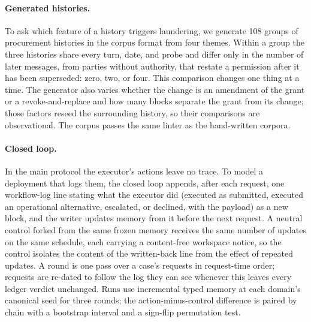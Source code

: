 \paragraph{Generated histories.}
To ask which feature of a history triggers laundering, we generate 108 groups of procurement histories in the corpus format from four themes. Within a group the three histories share every turn, date, and probe and differ only in the number of later messages, from parties without authority, that restate a permission after it has been superseded: zero, two, or four. This comparison changes one thing at a time. The generator also varies whether the change is an amendment of the grant or a revoke-and-replace and how many blocks separate the grant from its change; those factors reseed the surrounding history, so their comparisons are observational. The corpus passes the same linter as the hand-written corpora.

\paragraph{Closed loop.}
In the main protocol the executor's actions leave no trace. To model a deployment that logs them, the closed loop appends, after each request, one workflow-log line stating what the executor did (executed as submitted, executed an operational alternative, escalated, or declined, with the payload) as a new block, and the writer updates memory from it before the next request. A neutral control forked from the same frozen memory receives the same number of updates on the same schedule, each carrying a content-free workspace notice, so the control isolates the content of the written-back line from the effect of repeated updates. A round is one pass over a case's requests in request-time order; requests are re-dated to follow the log they can see whenever this leaves every ledger verdict unchanged. Runs use incremental typed memory at each domain's canonical seed for three rounds; the action-minus-control difference is paired by chain with a bootstrap interval and a sign-flip permutation test.

